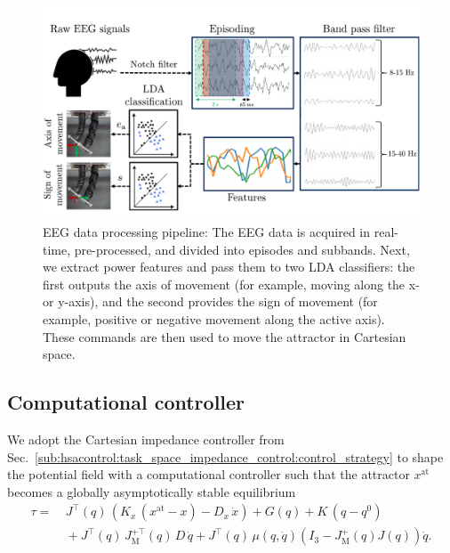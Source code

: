 \begin{figure}
\begin{center}
    \includegraphics[width=\columnwidth]{braincontrol/figures/eeg_pipeline/eeg_pipeline_v3_compressed.pdf}
    \caption{EEG data processing pipeline: The EEG data is acquired in real-time, pre-processed, and divided into episodes and subbands. Next, we extract power features and pass them to two LDA classifiers: the first outputs the axis of movement (for example, moving along the x- or y-axis), and the second provides the sign of movement (for example, positive or negative movement along the active axis). These commands are then used to move the attractor in Cartesian space.}
    \label{fig:braincontrol:eeg_pipeline}
\end{center}
\end{figure}

\subsection{Computational controller}\label{sub:braincontrol:computational_controller}
We adopt the Cartesian impedance controller from Sec.~\ref{sub:hsacontrol:task_space_impedance_control:control_strategy} to shape the potential field with a computational controller such that the attractor $x^\mathrm{at}$ becomes a globally asymptotically stable equilibrium
\begin{equation}\label{eq:braincontrol:cartesian_impedance_controller}
\begin{split}
    \tau =& \: J^\top(q) \, \left (K_x \, (x^\mathrm{at} - x) - D_x \, \dot{x} \right ) + G(q) + K \, (q-q^0)\\
    & \: + J^\top(q) \, J_\mathrm{M}^{+\top}(q) \, D \, \dot{q} + J^\top(q) \, \mu(q,\dot{q}) \left ( I_3 - J_\mathrm{M}^+(q) J(q) \right )\dot{q}.
\end{split}
\end{equation}

